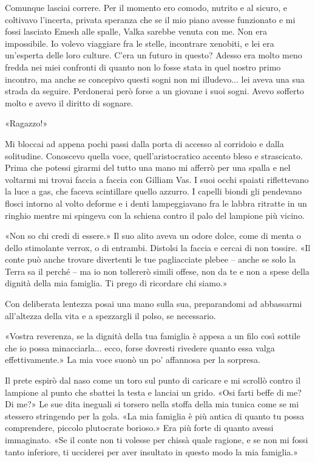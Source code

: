 Comunque lasciai correre. Per il momento ero comodo, nutrito e al
sicuro, e coltivavo l'incerta, privata speranza che se il mio piano
avesse funzionato e mi fossi lasciato Emesh alle spalle, Valka sarebbe
venuta con me. Non era impossibile. Io volevo viaggiare fra le stelle,
incontrare xenobiti, e lei era un'esperta delle loro culture. C'era un
futuro in questo? Adesso era molto meno fredda nei miei confronti di
quanto non lo fosse stata in quel nostro primo incontro, ma anche se
concepivo questi sogni non mi illudevo... lei aveva una sua strada da
seguire. Perdonerai però forse a un giovane i suoi sogni. Avevo sofferto
molto e avevo il diritto di sognare.

«Ragazzo!»

Mi bloccai ad appena pochi passi dalla porta di accesso al corridoio e
dalla solitudine. Conoscevo quella voce, quell'aristocratico accento
bleso e strascicato. Prima che potessi girarmi del tutto una mano mi
afferrò per una spalla e nel voltarmi mi trovai faccia a faccia con
Gilliam Vas. I suoi occhi spaiati riflettevano la luce a gas, che faceva
scintillare quello azzurro. I capelli biondi gli pendevano flosci
intorno al volto deforme e i denti lampeggiavano fra le labbra ritratte
in un ringhio mentre mi spingeva con la schiena contro il palo del
lampione più vicino.

«Non so chi credi di essere.» Il suo alito aveva un odore dolce, come di
menta o dello stimolante verrox, o di entrambi. Distolsi la faccia e
cercai di non tossire. «Il conte può anche trovare divertenti le tue
pagliacciate plebee -- anche se solo la Terra sa il perché -- ma io non
tollererò simili offese, non da te e non a spese della dignità della mia
famiglia. Ti prego di ricordare chi siamo.»

Con deliberata lentezza posai una mano sulla sua, preparandomi ad
abbassarmi all'altezza della vita e a spezzargli il polso, se
necessario.

«Vostra reverenza, se la dignità della tua famiglia è appesa a un filo
così sottile che io possa minacciarla... ecco, forse dovresti rivedere
quanto essa valga effettivamente.» La mia voce suonò un po' affannosa
per la sorpresa.

Il prete espirò dal naso come un toro sul punto di caricare e mi scrollò
contro il lampione al punto che sbattei la testa e lanciai un grido.
«Osi farti beffe di me? Di me?» Le sue dita ineguali si torsero nella
stoffa della mia tunica come se mi stessero stringendo per la gola. «La
mia famiglia è più antica di quanto tu possa comprendere, piccolo
plutocrate borioso.» Era più forte di quanto avessi immaginato. «Se il
conte non ti volesse per chissà quale ragione, e se non mi fossi tanto
inferiore, ti ucciderei per aver insultato in questo modo la mia
famiglia.»

